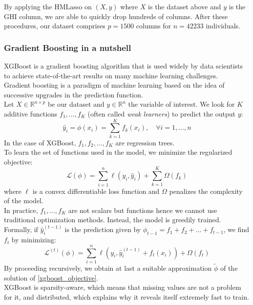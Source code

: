 \documentclass[]{article}
\begin{document}
By applying the HMLasso on $(X, y)$ where $X$ is the dataset above and $y$ is the GHI column, we are able to quickly drop hundreds of columns. After these procedures, our dataset comprises $p=1500$ columns for $n=42233$ individuals.
\subsubsection{Gradient Boosting in a nutshell}
XGBoost \cite{xgboost2016} is a gradient boosting algorithm that is used widely by data scientists to achieve state-of-the-art results on many machine learning challenges.\\
Gradient boosting is a paradigm of machine learning based on the idea of successive upgrades in the prediction function.\\

\noindent
Let $X\in \mathbb{R}^{n\times p}$ be our dataset and $y\in \mathbb{R}^n$ the variable of interest. We look for $K$ additive functions $f_1,\dots,f_K$ (often called \textit{weak learners}) to predict the output $y$:
\begin{equation}
	\hat{y}_i = \phi(x_i) = \sum_{k=1}^K f_k(x_i),\quad \forall i=1, \dots, n
\end{equation}
In the case of XGBoost, $f_1,f_2,\dots,f_K$ are regression trees.\\
To learn the set of functions used in the model, we minimize the regularized objective:
\begin{equation}
	\label{xgboost_objective}
	\mathcal{L}(\phi) = \sum_{i=1}^n \ell(y_i, \hat{y}_i) + \sum_{k=1}^K\Omega(f_k)
\end{equation}
where $\ell$ is a convex differentiable loss function and $\Omega$ penalizes the complexity of the model.\\

\noindent
In practice, $f_1,\dots,f_K$ are not scalars but functions hence we cannot use traditional optimization methods. Instead, the model is greedily trained. Formally, if $\hat{y}^{(t-1)}_i$ is the prediction given by $\phi_{t-1} = f_1 + f_2 + \dots + f_{t-1}$, we find $f_t$ by minimizing:
\begin{equation}
	\mathcal{L}^{(t)}(\phi) = \sum_{i=1}^n \ell(y_i, \hat{y}^{(t-1)}_i + f_t(x_i)) + \Omega(f_t)
\end{equation}
By proceeding recursively, we obtain at last a suitable approximation $\tilde{\phi}$ of the solution of \eqref{xgboost_objective}.\\
XGBoost is sparsity-aware, which means that missing values are not a problem for it, and distributed, which explains why it reveals itself extremely fast to train.
\end{document}
